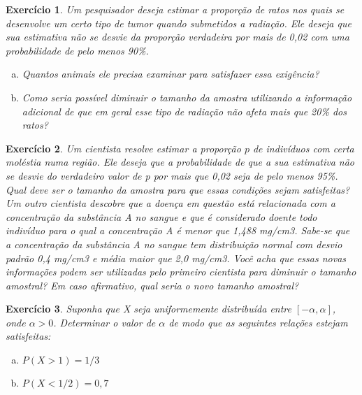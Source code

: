\documentclass[letter,11pt]{article}
\newtheorem{exer}{Exercício}
\begin{document}
\medskip
\begin{exer}\rm 
 Um pesquisador deseja estimar a proporção de ratos nos quais se desenvolve um certo tipo de tumor quando submetidos a radiação. Ele deseja que sua estimativa não se desvie da proporção verdadeira por mais de 0,02 com uma probabilidade de pelo menos 90\%.
\begin{enumerate}[a)]
\item Quantos animais ele precisa examinar para satisfazer essa exigência?
\item Como seria possível diminuir o tamanho da amostra utilizando a informação adicional de que em geral esse tipo de radiação não afeta mais que 20\% dos ratos?
\end{enumerate}
\end{exer}
 
 \medskip
\begin{exer}\rm 
Um cientista resolve estimar a proporção $p$ de indivíduos com certa moléstia numa região. Ele deseja que a probabilidade de que a sua estimativa não se desvie do verdadeiro valor de p por mais que 0,02 seja de pelo menos 95\%. Qual deve ser o tamanho da amostra para que essas condições sejam satisfeitas? Um outro cientista descobre que a doença em questão está relacionada com a concentração da substância A no sangue e que é considerado doente todo indivíduo para o qual a concentração A é menor que 1,488 mg/cm3. Sabe-se que a 
concentração da substância A no sangue tem distribuição normal com desvio padrão 0,4 mg/cm3 e média maior que 2,0 mg/cm3. Você acha que essas novas informações podem ser utilizadas pelo primeiro cientista para diminuir o tamanho amostral? Em caso afirmativo, qual seria o novo tamanho amostral?
\end{exer}

\medskip
\begin{exer} \rm
Suponha que X seja uniformemente distribuída entre $[-\alpha, \alpha]$, onde $\alpha > 0$. Determinar o valor de $\alpha$ de modo que as seguintes relações estejam satisfeitas: 
\begin{enumerate}[a)]
\item  $P(X > 1) = 1/3$

\item  $P(X < 1/2) = 0,7$

\end{enumerate}
\end{exer}%
\end{document}
